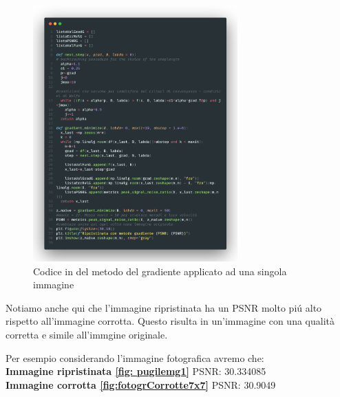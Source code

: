\begin{figure}[H]
    \centering
    \includegraphics[width=0.7\textwidth]{imgCode/metGrad.png}
    \caption{Codice in  del metodo del gradiente applicato ad una singola immagine}
\end{figure}

Notiamo anche qui che l'immagine ripristinata ha un PSNR molto piú alto rispetto all'immagine corrotta. 
Questo risulta in un'immagine con una qualità corretta e simile all'immgine originale.

Per esempio considerando l'immagine fotografica avremo che:\\
\textbf{Immagine ripristinata \ref{fig: pugilemg1}} PSNR: 30.334085\\
\textbf{Immagine corrotta \ref{fig:fotogrCorrotte7x7}} PSNR: 30.9049\\